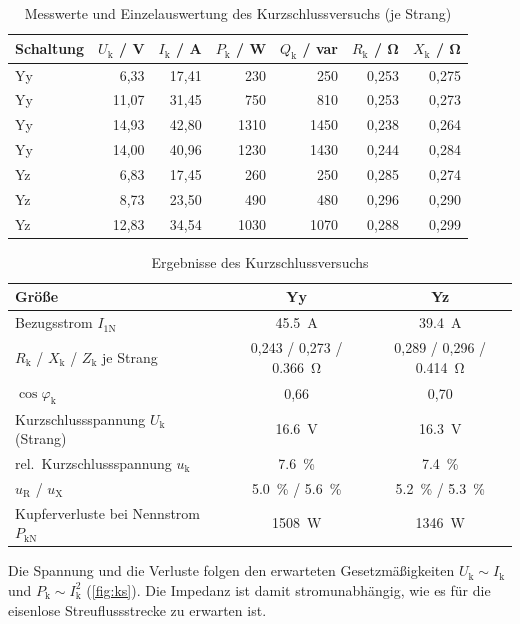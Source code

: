 \documentclass[a4paper,11pt]{scrreprt}
\begin{document}
\begin{table}[H]
\centering
\caption{Messwerte und Einzelauswertung des Kurzschlussversuchs (je Strang)}
\label{tab:ks}
\begin{tabular}{@{}lrrrrrr@{}}
\toprule
Schaltung & $U_\mathrm{k}$ / V & $I_\mathrm{k}$ / A & $P_\mathrm{k}$ / W & $Q_\mathrm{k}$ / var & $R_\mathrm{k}$ / \si{\ohm} & $X_\mathrm{k}$ / \si{\ohm}\\
\midrule
Yy & 6,33 & 17,41 & 230 & 250 & 0,253 & 0,275\\
Yy & 11,07 & 31,45 & 750 & 810 & 0,253 & 0,273\\
Yy & 14,93 & 42,80 & 1310 & 1450 & 0,238 & 0,264\\
Yy & 14,00 & 40,96 & 1230 & 1430 & 0,244 & 0,284\\
\midrule
Yz & 6,83 & 17,45 & 260 & 250 & 0,285 & 0,274\\
Yz & 8,73 & 23,50 & 490 & 480 & 0,296 & 0,290\\
Yz & 12,83 & 34,54 & 1030 & 1070 & 0,288 & 0,299\\
\bottomrule
\end{tabular}
\end{table}

\begin{table}[H]
\centering
\caption{Ergebnisse des Kurzschlussversuchs}
\label{tab:ks2}
\begin{tabular}{@{}lcc@{}}
\toprule
Größe & Yy & Yz\\
\midrule
Bezugsstrom $I_\mathrm{1N}$ & \SI{45.5}{A} & \SI{39.4}{A}\\
$R_\mathrm{k}$ / $X_\mathrm{k}$ / $Z_\mathrm{k}$ je Strang & 0,243 / 0,273 / \SI{0.366}{\ohm} & 0,289 / 0,296 / \SI{0.414}{\ohm}\\
$\cos\varphi_\mathrm{k}$ & 0,66 & 0,70\\
Kurzschlussspannung $U_\mathrm{k}$ (Strang) & \SI{16.6}{V} & \SI{16.3}{V}\\
rel.\ Kurzschlussspannung $u_\mathrm{k}$ & \SI{7.6}{\percent} & \SI{7.4}{\percent}\\
$u_\mathrm{R}$ / $u_\mathrm{X}$ & \SI{5.0}{\percent} / \SI{5.6}{\percent} & \SI{5.2}{\percent} / \SI{5.3}{\percent}\\
Kupferverluste bei Nennstrom $P_\mathrm{kN}$ & \SI{1508}{W} & \SI{1346}{W}\\
\bottomrule
\end{tabular}
\end{table}

Die Spannung und die Verluste folgen den erwarteten Gesetzmäßigkeiten $U_\mathrm{k}\sim I_\mathrm{k}$ und $P_\mathrm{k}\sim I_\mathrm{k}^2$ (\cref{fig:ks}). Die Impedanz ist damit stromunabhängig, wie es für die eisenlose Streuflussstrecke zu erwarten ist.
\end{document}
